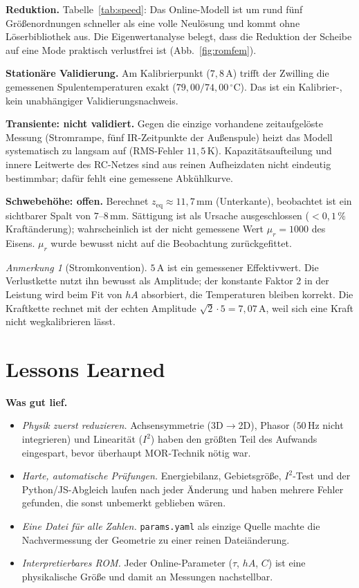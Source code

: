 \documentclass[a4paper, 10pt, conference]{ieeeconf}
\theoremstyle{remark}
\newtheorem{remark}{Anmerkung}
\begin{document}
\textbf{Reduktion.} Tabelle~\ref{tab:speed}: Das Online-Modell ist um
rund fünf Größenordnungen schneller als eine volle Neulösung und kommt ohne
Löserbibliothek aus. Die Eigenwertanalyse belegt, dass die Reduktion der
Scheibe auf eine Mode praktisch verlustfrei ist (Abb.~\ref{fig:romfem}).

\textbf{Stationäre Validierung.} Am Kalibrierpunkt ($7{,}8\,\mathrm A$)
trifft der Zwilling die gemessenen Spulentemperaturen exakt
($79{,}00/74{,}00\,^\circ$C). Das ist ein Kalibrier-, kein
unabhängiger Validierungsnachweis.

\textbf{Transiente: nicht validiert.} Gegen die einzige vorhandene
zeitaufgelöste Messung (Stromrampe, fünf IR-Zeitpunkte der Außenspule)
heizt das Modell systematisch zu langsam auf (RMS-Fehler
$11{,}5\,\mathrm K$). Kapazitätsaufteilung und innere Leitwerte des RC-Netzes
sind aus reinen Aufheizdaten nicht eindeutig bestimmbar; dafür fehlt eine
gemessene Abkühlkurve.

\textbf{Schwebehöhe: offen.} Berechnet $z_{\mathrm{eq}}\approx11{,}7\,$mm
(Unterkante), beobachtet ist ein sichtbarer Spalt von $7$--$8\,$mm.
Sättigung ist als Ursache ausgeschlossen ($<0{,}1\,\%$ Kraftänderung);
wahrscheinlich ist der nicht gemessene Wert $\mu_r=1000$ des Eisens.
$\mu_r$ wurde bewusst nicht auf die Beobachtung zurückgefittet.

\begin{remark}[Stromkonvention]
$5\,\mathrm A$ ist ein gemessener Effektivwert. Die Verlustkette nutzt ihn
bewusst als Amplitude; der konstante Faktor $2$ in der Leistung wird beim
Fit von $hA$ absorbiert, die Temperaturen bleiben korrekt. Die Kraftkette
rechnet mit der echten Amplitude $\sqrt2\cdot5=7{,}07\,\mathrm A$, weil
sich eine Kraft nicht wegkalibrieren lässt.
\end{remark}

\section{Lessons Learned}
\label{sec:lessons}

\textbf{Was gut lief.}
\begin{itemize}[leftmargin=*, nosep]
  \item \emph{Physik zuerst reduzieren.} Achsensymmetrie (3D$\to$2D),
        Phasor ($50\,$Hz nicht integrieren) und Linearität ($I^2$)
        haben den größten Teil des Aufwands eingespart, bevor überhaupt
        MOR-Technik nötig war.
  \item \emph{Harte, automatische Prüfungen.} Energiebilanz,
        Gebietsgröße, $I^2$-Test und der Python/JS-Abgleich laufen nach
        jeder Änderung und haben mehrere Fehler gefunden, die sonst
        unbemerkt geblieben wären.
  \item \emph{Eine Datei für alle Zahlen.} \texttt{params.yaml} als
        einzige Quelle machte die Nachvermessung der Geometrie zu einer
        reinen Dateiänderung.
  \item \emph{Interpretierbares ROM.} Jeder Online-Parameter
        ($\tau$, $hA$, $C$) ist eine physikalische Größe und damit an
        Messungen nachstellbar.
\end{itemize}
\end{document}
